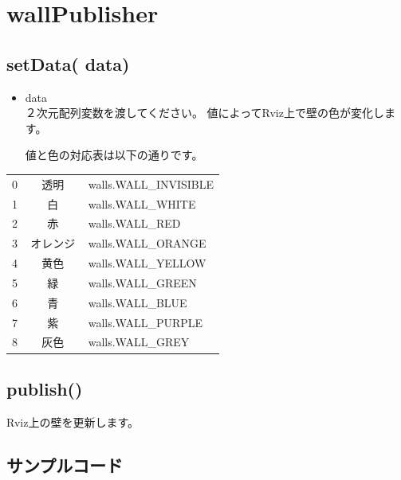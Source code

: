 \documentclass[11pt,a4paper]{jsarticle}
\begin{document}
\section*{wallPublisher}
\subsection*{setData( data)}
\begin{itemize}
\item{data}\\
２次元配列変数を渡してください。
値によってRviz上で壁の色が変化します。

値と色の対応表は以下の通りです。
\end{itemize}

\begin{table}[htb]
  \begin{tabular}{|l|c|l|}
    0 & 透明 　　& walls.WALL\_INVISIBLE \\
    1 & 白　　　 & walls.WALL\_WHITE \\
    2 & 赤　　　 & walls.WALL\_RED \\ 
    3 & オレンジ & walls.WALL\_ORANGE \\
    4 & 黄色　　 & walls.WALL\_YELLOW \\
    5 & 緑　　　 & walls.WALL\_GREEN \\
    6 & 青　　　 & walls.WALL\_BLUE \\
    7 & 紫　　　 & walls.WALL\_PURPLE \\
    8 & 灰色　　 & walls.WALL\_GREY \\
  \end{tabular}
\end{table}

\subsection*{publish()}
Rviz上の壁を更新します。

\subsection*{サンプルコード}

\end{document}
